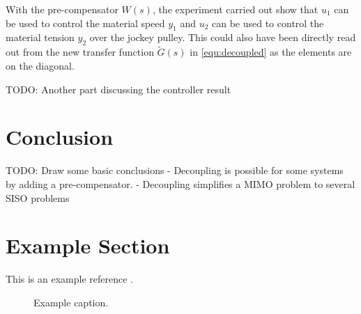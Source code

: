 \documentclass[a4paper, titlepage]{article}
\begin{document}
With the pre-compensator $W(s)$, the experiment carried out show that $u_1$ can be used to control the material speed $y_1$ and $u_2$ can be used to control the material tension $y_2$ over the jockey pulley.
This could also have been directly read out from the new transfer function $\tilde{G}(s)$ in \ref{equ:decoupled} as the elements are on the diagonal.

TODO: Another part discussing the controller result

\section{Conclusion}
TODO: Draw some basic conclusions
- Decoupling is possible for some systems by adding a pre-compensator.
- Decoupling simplifies a MIMO problem to several SISO problems



\clearpage


\clearpage
\appendix

\section{Example Section}
This is an example reference \citep{glad00}.

\begin{figure}[h!]
\center
\caption{Example caption.}
\label{fig:exampleLable}
\end{figure}


\end{document}
